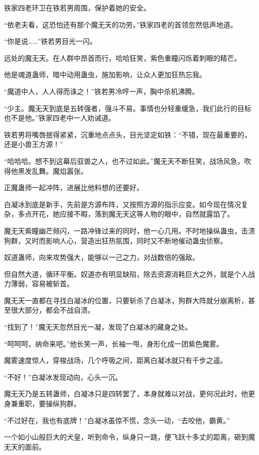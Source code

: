 \begin{this_body}
铁家四老环卫在铁若男周围，保护着她的安全。

“依老夫看，这恐怕还有那个魔无天的功劳。”铁家四老的首领忽然低声地道。

“你是说……”铁若男目光一闪。

远处的魔无天。在人群中昂首而行，哈哈狂笑，紫色重瞳闪烁着刺眼的精芒。

他是魂道蛊师，暗中动用蛊虫，施加影响，让众人更加狂热忘我。

“魔道中人，人人得而诛之！”铁若男冷哼一声，胸中杀机沸腾。

“少主。魔无天到底是五转强者，强斗不易。事情也分轻重缓急，我们此行的目标也不是他。”铁家四老中一人劝诫道。

铁若男将嘴唇抿得紧紧，沉重地点点头，目光坚定如铁：“不错，现在最重要的，还是小兽王方源！”

“哈哈哈。想不到这幕后驭兽之人，也不过如此。”魔无天不断狂笑，战场风急，吹得他黑发乱舞。魔焰嚣张。

正魔蛊师一起冲阵，进展比他料想的还要好。

白凝冰到底是新手，先前是方源布阵，又按照方源的指示应变。如今现在情况复杂，多点开花，她应接不暇，落到魔无天这等人物的眼中，自然就露馅了。

魔无天紫瞳幽芒频闪，一路冲锋过来的同时，他一心几用。不时地操纵蛊虫，击溃狗群，又时而影响人心，营造出狂热氛围，同时又不断地催动蛊虫侦察。

奴道蛊师，向来攻势强大，能够以一己之力，对战数倍的强敌。

但自然大道，循环平衡。奴道亦有明显缺陷，除去资源消耗巨大之外，就是个人战力薄弱，容易被斩首。

魔无天一直都在寻找白凝冰的位置，只要斩杀了白凝冰，狗群大阵就分崩离析，甚至很大部分，都会不战自溃。

“找到了！”魔无天忽然目光一凝，发现了白凝冰的藏身之处。

“呵呵呵，纳命来吧。”他长笑一声，长袖一甩，身形化成一团紫色魔雾。

魔雾速度惊人，穿梭战场，几个呼吸之间，距离白凝冰就只有千步之遥。

“不好！”白凝冰发现动向，心头一沉。

魔无天乃是五转蛊师，白凝冰只是四转罢了，本身就难以对战，更何况此时，他更身兼重职，要操纵狗群。

“不过好在，我也有底牌！”白凝冰虽惊不慌，念头一动，“去咬他，霸黄。”

一个如小山般巨大的犬皇，听到命令，纵身只一跳，便飞跃十多丈的距离，砸到魔无天的面前。


\end{this_body}
